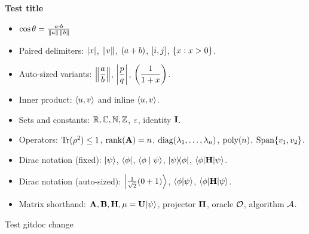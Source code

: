 \documentclass[12pt]{article} %
\begin{document}
\begin{center}
    {\textbf{Test title}\\}
\end{center}
\begin{itemize}[topsep=-3pt, itemsep = -1pt]
    \item $\cos{\theta} = \frac{a \cdot b}{\norm{a}\,\norm{b}}$
\end{itemize}


\separate


\begin{itemize}[topsep=-3pt, itemsep=-1pt]
    \item Paired delimiters: $\abs{x}$, $\norm{v}$, $\parens{a+b}$, $\bracks{i,j}$, $\braces{x : x > 0}$.
    \item Auto-sized variants: $\Norm{\dfrac{a}{b}}$, $\Abs{\dfrac{p}{q}}$, $\Par{\dfrac{1}{1+x}}$.
    \item Inner product: $\inprod{u}{v}$ and inline $\inprods{u}{v}$.
    \item Sets and constants: $\R, \C, \N, \Z$, $\eps$, identity $\id$.
    \item Operators: $\Tr(\rho^2) \le 1$, $\rank(\ma) = n$, $\diagop(\lambda_1,\ldots,\lambda_n)$, $\poly(n)$, $\Span\{v_1, v_2\}$.
    \item Dirac notation (fixed): $\ket{\psi}$, $\bra{\phi}$, $\braket{\phi}{\psi}$, $\ketbra{\psi}{\phi}$, $\mel{\phi}{\mh}{\psi}$.
    \item Dirac notation (auto-sized): $\Ket{\tfrac{1}{\sqrt{2}}(0 + 1)}$, $\Braket{\phi}{\psi}$, $\Mel{\phi}{\mh}{\psi}$.
    \item Matrix shorthand: $\ma, \mb, \mh, \mu = \mmu \ket{\psi}$, projector $\mproj$, oracle $\oracle$, algorithm $\alg$.
\end{itemize}


\separate

Test gitdoc change 




\printbibliography
\end{document}
